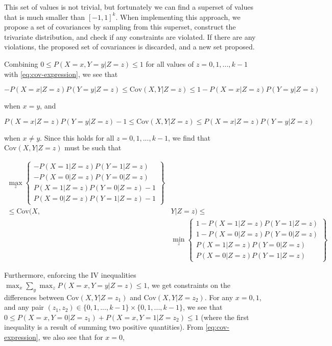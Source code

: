\documentclass[
]{article}
\theoremstyle{plain}
\begin{document}
This set of values is not trivial, but fortunately we can find a superset of values that is much smaller than \([-1,1]^k\). When implementing this approach, we propose a set of covariances by sampling from this superset, construct the trivariate distribution, and check if any constraints are violated. If there are any violations, the proposed set of covariances is discarded, and a new set proposed.

Combining \(0 \le P(X = x, Y = y | Z = z) \le 1\) for all values of \(z = 0, 1, ..., k-1\) with \eqref{eq:cov-expression}, we see that

\begin{equation*}
-P(X = x | Z = z) P(Y = y | Z = z) \le \text{Cov}(X, Y | Z = z) \le 1 - P(X = x | Z = z)P(Y = y | Z = z)
\end{equation*}

when \(x = y\), and

\begin{equation*}
P(X = x | Z = z) P(Y = y | Z = z) - 1 \le \text{Cov}(X, Y | Z = z) \le P(X = x | Z = z)P(Y = y | Z = z)
\end{equation*}

when \(x \neq y\). Since this holds for all \(z = 0,1,...,k-1\), we find that \(\text{Cov}(X, Y | Z = z)\) must be such that

\[
\begin{aligned}
  \max_z\left\{ 
      \begin{array}{c}
        -P(X = 1 | Z = z)P(Y = 1 | Z = z) \\
        -P(X = 0 | Z = z)P(Y = 0 | Z = z) \\ 
        P(X = 1 | Z = z)P(Y = 0 | Z = z) - 1\\
        P(X = 0 | Z = z)P(Y = 1 | Z = z) - 1
      \end{array} 
    \right\} & \\ 
    \le \text{Cov}(X, &Y | Z = z) \le \\
    &\min_z\left\{ 
      \begin{array}{c}
        1 - P(X = 1 | Z = z)P(Y = 1 | Z = z) \\
        1 - P(X = 0 | Z = z)P(Y = 0 | Z = z) \\ 
        P(X = 1 | Z = z)P(Y = 0 | Z = z) \\
        P(X = 0 | Z = z)P(Y = 1 | Z = z)
      \end{array} 
    \right\}
\end{aligned}
\]

Furthermore, enforcing the IV inequalities \(\max_x \sum_y \max_z P(X = x, Y = y | Z = z) \le 1\), we get constraints on the differences between \(\text{Cov}(X, Y | Z = z_1)\) and \(\text{Cov}(X, Y | Z = z_2)\). For any \(x=0,1\), and any pair \((z_1, z_2) \in \{0,1,...,k-1\} \times \{0,1,...,k-1\}\), we see that \(0 \le P(X = x, Y = 0 | Z = z_1) + P(X = x, Y = 1 | Z = z_2) \le 1\) (where the first inequality is a result of summing two positive quantities). From \eqref{eq:cov-expression}, we also see that for \(x=0\),
\end{document}
